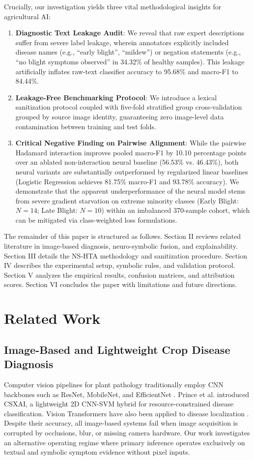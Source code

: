 \documentclass[conference]{IEEEtran}
\begin{document}
Crucially, our investigation yields three vital methodological insights for agricultural AI:
\begin{enumerate}
    \item \textbf{Diagnostic Text Leakage Audit}: We reveal that raw expert descriptions suffer from severe label leakage, wherein annotators explicitly included disease names (e.g., ``early blight'', ``mildew'') or negation statements (e.g., ``no blight symptoms observed'' in 34.32\% of healthy samples). This leakage artificially inflates raw-text classifier accuracy to 95.68\% and macro-F1 to 84.44\%.
    \item \textbf{Leakage-Free Benchmarking Protocol}: We introduce a lexical sanitization protocol coupled with five-fold stratified group cross-validation grouped by source image identity, guaranteeing zero image-level data contamination between training and test folds.
    \item \textbf{Critical Negative Finding on Pairwise Alignment}: While the pairwise Hadamard interaction improves pooled macro-F1 by 10.10 percentage points over an ablated non-interaction neural baseline (56.53\% vs. 46.43\%), both neural variants are substantially outperformed by regularized linear baselines (Logistic Regression achieves 81.75\% macro-F1 and 93.78\% accuracy). We demonstrate that the apparent underperformance of the neural model stems from severe gradient starvation on extreme minority classes (Early Blight: $N=14$; Late Blight: $N=10$) within an imbalanced 370-sample cohort, which can be mitigated via class-weighted loss formulations.
\end{enumerate}

The remainder of this paper is structured as follows. Section II reviews related literature in image-based diagnosis, neuro-symbolic fusion, and explainability. Section III details the NS-HTA methodology and sanitization procedure. Section IV describes the experimental setup, symbolic rules, and validation protocol. Section V analyzes the empirical results, confusion matrices, and attribution scores. Section VI concludes the paper with limitations and future directions.

\section{Related Work}

\subsection{Image-Based and Lightweight Crop Disease Diagnosis}
Computer vision pipelines for plant pathology traditionally employ CNN backbones such as ResNet, MobileNet, and EfficientNet \cite{pacal2024, das2024}. Prince et al. \cite{prince2024} introduced CSXAI, a lightweight 2D CNN-SVM hybrid for resource-constrained disease classification. Vision Transformers have also been applied to disease localization \cite{hemalatha2024}. Despite their accuracy, all image-based systems fail when image acquisition is corrupted by occlusions, blur, or missing camera hardware. Our work investigates an alternative operating regime where primary inference operates exclusively on textual and symbolic symptom evidence without pixel inputs.
\end{document}
